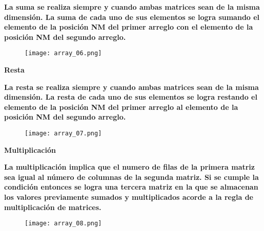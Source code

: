 \documentclass[letterpaper]{article}
\begin{document}
\begin{flushleft}
\textbf{\Large La suma se realiza siempre y cuando ambas matrices sean de la misma dimensi\'on. La suma de cada uno de sus elementos se logra sumando el elemento de la posici\'on NM del primer arreglo con el elemento de la posici\'on NM del segundo arreglo.\\}
\end{flushleft}

\begin{center}
\begin{figure}[H] %
\texttt{[image: array\_06.png]}
\end{figure}
\end{center}

\vspace{-1.0cm}

\begin{center}
\textbf{\LARGE Resta\\}
\vspace{0.5cm}
\end{center}

\begin{flushleft}
\textbf{\Large La resta se realiza siempre y cuando ambas matrices sean de la misma dimensi\'on. La resta de cada uno de sus elementos se logra restando el elemento de la posici\'on NM del primer arreglo al elemento de la posici\'on NM del segundo arreglo.\\}
\end{flushleft}

\begin{center}
\begin{figure}[H] %
\texttt{[image: array\_07.png]}
\end{figure}
\end{center}

\clearpage

\begin{center}
\textbf{\LARGE Multiplicaci\'on\\}
\vspace{0.5cm}
\end{center}

\begin{flushleft}
\textbf{\Large La multiplicaci\'on implica que el numero de filas de la primera matriz sea igual al n\'umero de columnas de la segunda matriz. Si se cumple la condici\'on entonces se logra una tercera matriz en la que se almacenan los valores previamente sumados y multiplicados acorde a la regla de multiplicaci\'on de matrices.\\}

\end{flushleft}
\begin{center}
\begin{figure}[H] %
\texttt{[image: array\_08.png]}
\end{figure}
\end{center}
\end{document}
